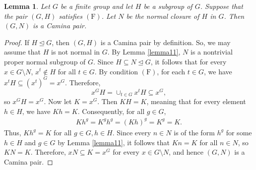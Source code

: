 \documentclass[twoside,a4paper,reqno,11pt]{amsart}
\newcommand{\<}{\langle}
\renewcommand{\>}{\rangle}
\newcommand{\F}{\mathrm{(F)}}
\renewcommand{\:}{\colon}
\newtheorem{lem}[thm]{Lemma}
\theoremstyle{definition}
\begin{document}
\begin{lem}\label{lemma8}
Let $G$ be a finite group and let $H$ be a subgroup of $G$.	Suppose that the pair $(G,H)$ satisfies $\F$. Let $N$ be the normal closure of $H$ in $G$. Then $(G,N)$ is a Camina pair. 
\end{lem}
\begin{proof} If $H\unlhd G$, then $(G,H)$ is a Camina pair by definition. So, we may assume that $H$ is not normal in $G$. By Lemma \ref{lemma11}, $N$ is a nontrivial proper normal subgroup of $G$. Since $H\subseteq N\unlhd G$, it follows that  for every $x \in G\setminus N$, $x^t\not\in H$ for all $t\in G$.  By condition $\F$, for each $t\in G$, we have $x^tH\subseteq (x^t)^G = x^G$. Therefore, $$x^GH = \cup_{t\in G}x^tH\subseteq x^G,$$ so $x^GH = x^G$. Now let $K=x^G$. Then  $KH=K$, meaning that for every element $h\in H$, we have $Kh=K$. Consequently, for all $g\in G$,
	\begin{align*}
		Kh^g = K^gh^g = (Kh)^g = K^g = K.
	\end{align*}
Thus, $Kh^g = K$ for all $g\in G, h\in H$. Since every $n\in N$ is of the form  $h^g$ for some $h\in H$ and $g\in G$ by Lemma \ref{lemma11}, it follows that  $Kn = K$ for all $n\in N$, so  $KN = K$. Therefore, $xN \subseteq K = x^G$ for every $x\in G\setminus N$, and hence $(G,N)$ is a Camina pair.  
\end{proof}
\end{document}
